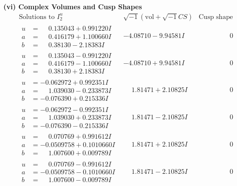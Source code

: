 \documentclass[1p]{elsarticle_modified}
\theoremstyle{definition}
\newcommand{\I}{\sqrt{-1}}
\begin{document}
\newpage\flushleft \textbf{(vi) Complex Volumes and Cusp Shapes}
$$\begin{array}{c|c|c}  
\text{Solutions to }I^u_{2}& \I (\text{vol} + \sqrt{-1}CS) & \text{Cusp shape}\\
 \hline 
\begin{aligned}
u &= \phantom{-}0.135043 + 0.991220 I \\
a &= \phantom{-}0.416179 + 1.100660 I \\
b &= \phantom{-}0.38130 - 2.18383 I\end{aligned}
 & -4.08710 - 9.94581 I & \phantom{-0.000000 } 0 \\ \hline\begin{aligned}
u &= \phantom{-}0.135043 - 0.991220 I \\
a &= \phantom{-}0.416179 - 1.100660 I \\
b &= \phantom{-}0.38130 + 2.18383 I\end{aligned}
 & -4.08710 + 9.94581 I & \phantom{-0.000000 } 0 \\ \hline\begin{aligned}
u &= -0.062972 + 0.992351 I \\
a &= \phantom{-}1.039030 - 0.233873 I \\
b &= -0.076390 + 0.215336 I\end{aligned}
 & \phantom{-}1.81471 + 2.10825 I & \phantom{-0.000000 } 0 \\ \hline\begin{aligned}
u &= -0.062972 - 0.992351 I \\
a &= \phantom{-}1.039030 + 0.233873 I \\
b &= -0.076390 - 0.215336 I\end{aligned}
 & \phantom{-}1.81471 - 2.10825 I & \phantom{-0.000000 } 0 \\ \hline\begin{aligned}
u &= \phantom{-}0.070769 + 0.991612 I \\
a &= -0.0509758 + 0.1010660 I \\
b &= \phantom{-}1.007600 + 0.009789 I\end{aligned}
 & \phantom{-}1.81471 + 2.10825 I & \phantom{-0.000000 } 0 \\ \hline\begin{aligned}
u &= \phantom{-}0.070769 - 0.991612 I \\
a &= -0.0509758 - 0.1010660 I \\
b &= \phantom{-}1.007600 - 0.009789 I\end{aligned}
 & \phantom{-}1.81471 - 2.10825 I & \phantom{-0.000000 } 0 \\ \hline\begin{aligned}

\end{aligned}
\end{array}$$
\end{document}
